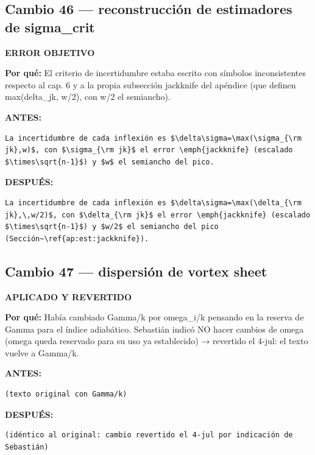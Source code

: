 \documentclass[11pt,a4paper]{article}
\begin{document}
\subsection*{Cambio 46 --- reconstrucción de estimadores de sigma\_crit}
\colorbox{okbg}{\textbf{\footnotesize ERROR OBJETIVO}}

\textbf{Por qué:} El criterio de incertidumbre estaba escrito con símbolos inconsistentes respecto al cap. 6 y a la propia subsección jackknife del apéndice (que definen max(delta\_jk, w/2), con w/2 el semiancho).

\textcolor{antesline}{\textbf{ANTES:}}
\begin{Verbatim}[breaklines=true, breakanywhere=true, fontsize=\small, frame=leftline, rulecolor=\color{antesline}, framerule=1.2pt]
La incertidumbre de cada inflexión es $\delta\sigma=\max(\sigma_{\rm jk},w)$, con $\sigma_{\rm jk}$ el error \emph{jackknife} (escalado $\times\sqrt{n-1}$) y $w$ el semiancho del pico. 
\end{Verbatim}
\textcolor{despline}{\textbf{DESPUÉS:}}
\begin{Verbatim}[breaklines=true, breakanywhere=true, fontsize=\small, frame=leftline, rulecolor=\color{despline}, framerule=1.2pt]
La incertidumbre de cada inflexión es $\delta\sigma=\max(\delta_{\rm jk},\,w/2)$, con $\delta_{\rm jk}$ el error \emph{jackknife} (escalado $\times\sqrt{n-1}$) y $w/2$ el semiancho del pico (Sección~\ref{ap:est:jackknife}).
\end{Verbatim}

\subsection*{Cambio 47 --- dispersión de vortex sheet}
\colorbox{revbg}{\textbf{\footnotesize APLICADO Y REVERTIDO}}

\textbf{Por qué:} Había cambiado Gamma/k por omega\_i/k pensando en la reserva de Gamma para el índice adiabático. Sebastián indicó NO hacer cambios de omega (omega queda reservado para su uso ya establecido) → revertido el 4-jul: el texto vuelve a Gamma/k.

\textcolor{antesline}{\textbf{ANTES:}}
\begin{Verbatim}[breaklines=true, breakanywhere=true, fontsize=\small, frame=leftline, rulecolor=\color{antesline}, framerule=1.2pt]
(texto original con Gamma/k)
\end{Verbatim}
\textcolor{despline}{\textbf{DESPUÉS:}}
\begin{Verbatim}[breaklines=true, breakanywhere=true, fontsize=\small, frame=leftline, rulecolor=\color{despline}, framerule=1.2pt]
(idéntico al original: cambio revertido el 4-jul por indicación de Sebastián)
\end{Verbatim}
\end{document}
